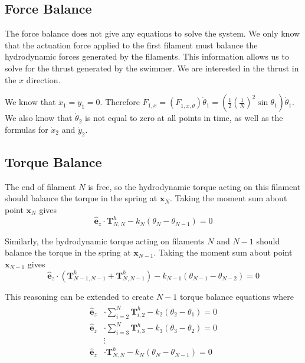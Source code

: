 \documentclass[12pt,letterpaper,titlepage]{article}
\newcommand{\uvec}[1]{\mathbf{\hat{#1}}}
\begin{document}
\subsection{Force Balance}
The force balance does not give any equations to solve the system. We only know that the actuation force applied to the first filament must balance the hydrodynamic forces generated by the filaments. This information allows us to solve for the thrust generated by the swimmer. We are interested in the thrust in the $x$ direction.

We know that $\dot{x}_1 = \dot{y}_1 = 0$. Therefore $F_{1,x} = (F_{1,x,\dot{\theta}}) \dot{\theta}_1 = (\frac{1}{2} ( \frac{1}{N} )^2 \sin \theta_1) \dot{\theta}_1$. We also know that $\dot{\theta}_2$ is not equal to zero at all points in time, as well as the formulas for $\dot{x}_2$ and $\dot{y}_2$.

\subsection{Torque Balance}
The end of filament $N$ is free, so the hydrodynamic torque acting on this filament should balance the torque in the spring at $\mathbf{x}_N$. Taking the moment sum about point $\mathbf{x}_N$ gives
\begin{equation}
\uvec{e}_z  \cdot \mathbf{T}_{N,N}^h - k_N(\theta_N - \theta_{N-1}) = 0
\end{equation}

Similarly, the hydrodynamic torque acting on filaments $N$ and $N-1$ should balance the torque in the spring at $\mathbf{x}_{N-1}$. Taking the moment sum about point $\mathbf{x}_{N-1}$ gives
\begin{equation}
\uvec{e}_z \cdot (\mathbf{T}_{N-1,N-1}^h + \mathbf{T}_{N,N-1}^h) - k_{N-1}(\theta_{N-1} - \theta_{N-2}) = 0
\end{equation}

This reasoning can be extended to create $N-1$ torque balance equations where
\begin{align}
\begin{split}
\uvec{e}_z &\cdot \sum_{i=2}^{N} \mathbf{T}_{i,2}^h - k_2(\theta_2 - \theta_1) = 0 \\
\uvec{e}_z &\cdot \sum_{i=3}^{N} \mathbf{T}_{i,3}^h - k_3(\theta_3 - \theta_2) = 0 \\
&\vdots \\
\uvec{e}_z &\cdot \mathbf{T}_{N,N}^h - k_N(\theta_N - \theta_{N-1}) = 0
\end{split}
\end{align}
\end{document}
